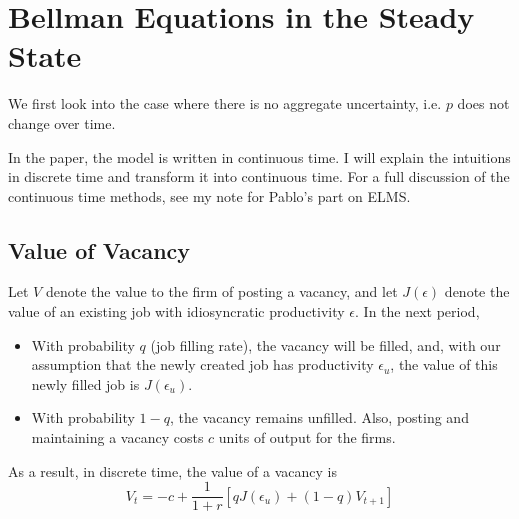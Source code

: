 \documentclass[12pt]{article}
\begin{document}
%	

\section{Bellman Equations in the Steady State}

We first look into the case where there is no aggregate uncertainty, i.e. $p$ does not change over time. 

In the paper, the model is written in continuous time. I will explain the intuitions in discrete time and transform it into continuous time. For a full discussion of the continuous time methods, see my note for Pablo's part on ELMS.

\subsection{Value of Vacancy}

Let $V$ denote the value to the firm of posting a vacancy, and let $J(\epsilon)$ denote the value of an existing job with idiosyncratic productivity $\epsilon$. In the next period,
\begin{itemize}
\item With probability $q$ (job filling rate), the vacancy will be filled, and, with our assumption that the newly created job has productivity $\epsilon_u$, the value of this newly filled job is $J(\epsilon_u)$. 
\item With probability $1-q$, the vacancy remains unfilled. Also, posting and maintaining a vacancy costs $c$ units of output for the firms. 
\end{itemize}
As a result, in discrete time, the value of a vacancy is 
\begin{equation}
	V_t = - c + \frac{1}{1+r} \left[q J(\epsilon_u) + (1-q) V_{t+1} \right]
\end{equation}  
\end{document}
